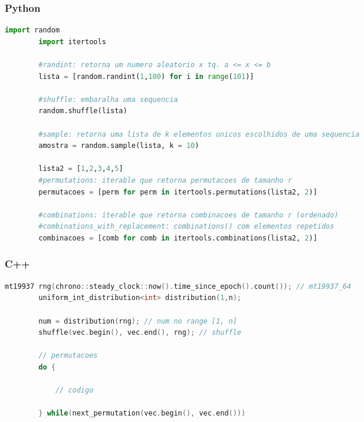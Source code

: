 \begin{multicols}{2}
    \subsubsection*{Python}
    
    \begin{lstlisting}[language=Python]
        import random
        import itertools
    
        #randint: retorna um numero aleatorio x tq. a <= x <= b
        lista = [random.randint(1,100) for i in range(101)]
    
        #shuffle: embaralha uma sequencia
        random.shuffle(lista)
    
        #sample: retorna uma lista de k elementos unicos escolhidos de uma sequencia
        amostra = random.sample(lista, k = 10)
    
        lista2 = [1,2,3,4,5]
        #permutations: iterable que retorna permutacoes de tamanho r
        permutacoes = [perm for perm in itertools.permutations(lista2, 2)]
        
        #combinations: iterable que retorna combinacoes de tamanho r (ordenado)
        #combinations_with_replacement: combinations() com elementos repetidos
        combinacoes = [comb for comb in itertools.combinations(lista2, 2)]
    \end{lstlisting}
    
    \subsubsection*{C++}
    
    \begin{lstlisting}[language=c++]
        mt19937 rng(chrono::steady_clock::now().time_since_epoch().count()); // mt19937_64
        uniform_int_distribution<int> distribution(1,n);
    
        num = distribution(rng); // num no range [1, n]
        shuffle(vec.begin(), vec.end(), rng); // shuffle
    
        // permutacoes 
        do {

            // codigo

        } while(next_permutation(vec.begin(), vec.end()))
    
    \end{lstlisting}
    
\end{multicols}